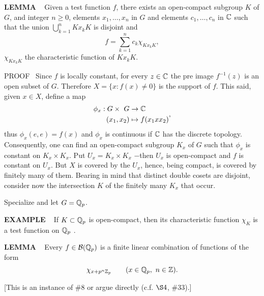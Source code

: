 \vspace{0.1cm}

\begin{x}{\small\bf LEMMA} \ %
Given a test function $f$, there exists an open-compact subgroup $K$ of $G$, and integer 
$n \ge 0$, elements $x_1, \ldots, x_n$ in $G$ and elements $c_1, \ldots, c_n$ in $\mathbb{C}$ such that the union
$\bigcup\limits_{k=1}^n K x_k K	$ is disjoint and 
\[
f = \sum_{k=1}^n c_k \chi_{K x_k K},	
\]
$\chi_{K x_k K}$ the characteristic function of $K x_k K$.
\vspace{0.1cm}

\vspace{0.1cm}

PROOF \ 
Since $f$ is locally constant, for every $z \in \mathbb{C}$ the pre image $f^{-1}(z)$ is an open subset of $G$.  
Therefore $X = \{x:f(x) \ne 0\}$ is the support of $f$.  
This said, given $x \in X$, define a map
\[
\begin{aligned}
\phi_x: G \times\ G 		&\rightarrow \mathbb{C}\\	
(x_1, x_2) 				&\mapsto f(x_1 x x_2)\\	
\end{aligned}
,
\]
thus $\phi_x(e,e) = f(x) $ and $\phi_x$ is continuous if $\mathbb{C}$ has the discrete topology. 
Consequently, one can find an open-compact subgroup $K_x$ of $G$ such that $\phi_x$ is constant on $K_x \times K_x$.  
Put $U_x = K_x \times K_x$ $-$then $U_x$ is open-compact and $f$ is constant on $U_x$.  
But $X$ is covered by the $U_x$, hence, being compact, is covered by finitely many of them.  
Bearing in mind that distinct double cosets are disjoint, consider now the intersection $K$ of the finitely many $K_x$ that occur.

\end{x}

\vspace{0.1cm}

Specialize and let $G = \mathbb{Q}_p$.
\\
\begin{x}{\small\bf EXAMPLE} \ %
If $K \subset \mathbb{Q}_p$ is open-compact, then its characteristic function $\chi_K$ is a test function on $\mathbb{Q}_p$ .
\end{x}

\vspace{0.1cm}

\begin{x}{\small\bf LEMMA} \ %
Every $f \in \mathcal{B}(\mathbb{Q}_p)$ is a finite linear combination of functions of the form
\[
\chi_{x+p^n \mathbb{Z}_p}		\qquad (x \in \mathbb{Q}_p, \ n \in \mathbb{Z}).
\]

[This is an instance of $\# 8$ or argue directly (c.f. $\S 4$, $\#33$).]
\end{x}

